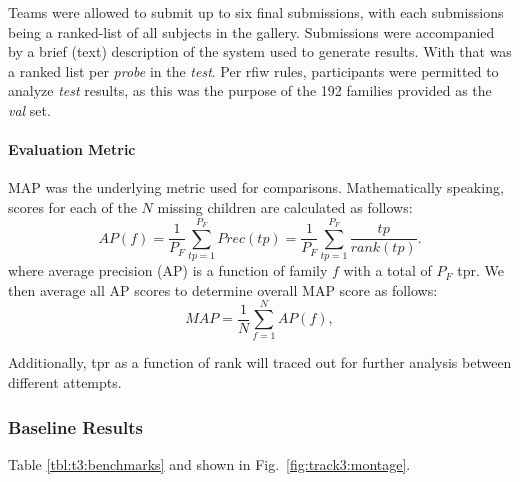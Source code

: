 \documentclass[letterpaper, 10 pt, conference]{ieeeconf}
\begin{document}
Teams were allowed to submit up to six final submissions, with each submissions being a ranked-list of all subjects in the gallery. Submissions were accompanied by a brief (text) description of the system used to generate results. With that was a ranked list per \textit{probe} in the \textit{test}. Per \ac{rfiw} rules, participants were permitted to analyze \emph{test} results, as this was the purpose of the 192 families provided as the \emph{val} set.

\paragraph{Evaluation Metric} 
MAP was the underlying metric used for comparisons. Mathematically speaking, scores for each of the $N$ missing children are calculated as follows:
$$AP(f)=\frac{1}{P_F}\sum^{P_F}_{tp=1}Prec(tp)=\frac{1}{P_F}\sum^{P_F}_{tp=1}\frac{tp}{rank(tp)}.$$
where average precision (AP) is a function of family $f$ with a total of ${P_F}$ \ac{tpr}. We then average all AP scores to determine overall MAP score as follows:
$$MAP = \frac{1}{N}\sum^{N}_{f=1}AP(f),$$



Additionally, \ac{tpr} as a function of rank will traced out for further analysis between different attempts.




\subsubsection{Baseline Results}
Table \ref{tbl:t3:benchmarks} and shown in Fig.~\ref{fig:track3:montage}.
\end{document}
